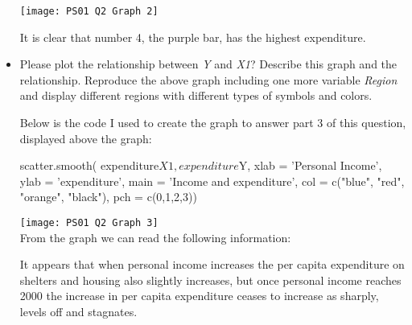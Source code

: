 \documentclass[12pt,letterpaper]{article}
\begin{document}
\begin{itemize}
\texttt{[image: PS01 Q2 Graph 2]}


It is clear that number 4, the purple bar, has the highest expenditure.


\item
Please plot the relationship between \emph{Y} and \emph{X1}? Describe this graph and the relationship. Reproduce the above graph including one more variable \emph{Region} and display different regions with different types of symbols and colors.

Below is the code I used to create the graph to answer part 3 of this question, displayed above the graph:


scatter.smooth( expenditure$X1, expenditure$Y, xlab = 'Personal Income', ylab = 'expenditure', main = 'Income and expenditure', col = c("blue", "red", "orange", "black"), pch = c(0,1,2,3))

\texttt{[image: PS01 Q2 Graph 3]}\\



From the graph we can read the following information: 

It appears that when personal income increases the per capita expenditure on shelters and housing also slightly increases, but once personal income reaches 2000 the increase in per capita expenditure ceases to increase as sharply, levels off and stagnates. 






\end{itemize}
\end{document}
